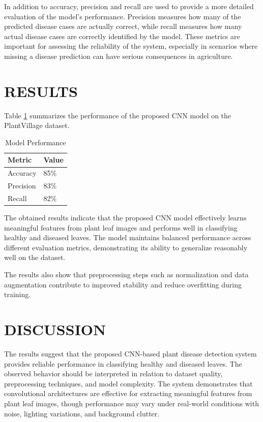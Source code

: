 \documentclass[12pt]{report}
\begin{document}
In addition to accuracy, precision and recall are used to provide a more detailed evaluation of the model’s performance. Precision measures how many of the predicted disease cases are actually correct, while recall measures how many actual disease cases are correctly identified by the model. These metrics are important for assessing the reliability of the system, especially in scenarios where missing a disease prediction can have serious consequences in agriculture.

\section{RESULTS}

Table \ref{tab:model-performance} summarizes the performance of the proposed CNN model on the PlantVillage dataset.

\begin{table}[h]
\centering
\caption{Model Performance}
\label{tab:model-performance}
\renewcommand{\arraystretch}{1.3}
\begin{tabular}{|p{5cm}|p{5cm}|}
\hline
\textbf{Metric} & \textbf{Value} \\ \hline
Accuracy & 85\% \\ \hline
Precision & 83\% \\ \hline
Recall & 82\% \\ \hline
\end{tabular}
\end{table}

The obtained results indicate that the proposed CNN model effectively learns meaningful features from plant leaf images and performs well in classifying healthy and diseased leaves. The model maintains balanced performance across different evaluation metrics, demonstrating its ability to generalize reasonably well on the dataset.

The results also show that preprocessing steps such as normalization and data augmentation contribute to improved stability and reduce overfitting during training.

\section{DISCUSSION}
The results suggest that the proposed CNN-based plant disease detection system provides reliable performance in classifying healthy and diseased leaves. The observed behavior should be interpreted in relation to dataset quality, preprocessing techniques, and model complexity. The system demonstrates that convolutional architectures are effective for extracting meaningful features from plant leaf images, though performance may vary under real-world conditions with noise, lighting variations, and background clutter.
\end{document}
